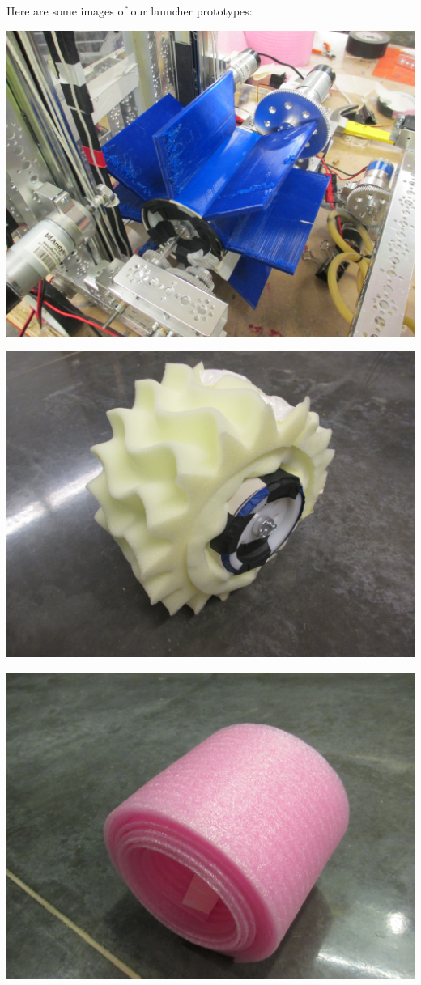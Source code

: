 \pagebreak

Here are some images of our launcher prototypes:

\begin{center}
 \includegraphics[width=\textwidth]{./Entries/Images/launchProto7.JPG}

 \includegraphics[width=\textwidth]{./Entries/Images/launchProto2.JPG}

 \includegraphics[width=\textwidth]{./Entries/Images/launchProto12.JPG}
\end{center}


